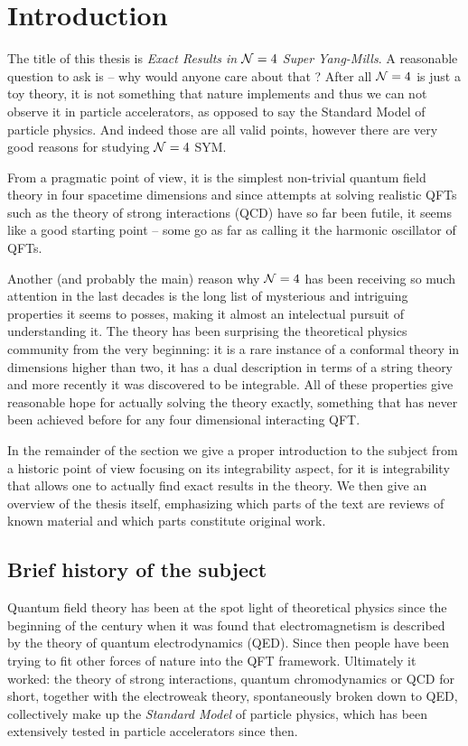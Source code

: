 
\section{Introduction}

The title of this thesis is \emph{Exact Results in $\mathcal{N}=4$ Super Yang-Mills}. A reasonable question to ask is -- why would anyone care about that ? 
After all $\mathcal{N}=4$ is just a toy theory, it is not something that nature implements and thus we can not observe it in particle accelerators, as opposed to say the Standard Model of particle physics. 
And indeed those are all valid points, however there are very good reasons for studying $\mathcal{N}=4$ SYM. 

From a pragmatic point of view, it is the simplest non-trivial quantum field theory in four spacetime dimensions and since attempts at solving realistic QFTs such as the theory of strong interactions (QCD) have so far been futile, it seems like a good starting point -- some go as far as calling it the harmonic oscillator of QFTs. 

Another (and probably the main) reason why $\mathcal{N}=4$ has been receiving so much attention in the last decades is the long list of mysterious and intriguing properties it seems to posses, making it almost an intelectual pursuit of understanding it. 
The theory has been surprising the theoretical physics community from the very beginning: it is a rare instance of a conformal theory in dimensions higher than two, it has a dual description in terms of a string theory and more recently it was discovered to be integrable. 
All of these properties give reasonable hope for actually solving the theory exactly, something that has never been achieved before for any four dimensional interacting QFT.

In the remainder of the section we give a proper introduction to the subject from a historic point of view focusing on its integrability aspect, for it is integrability that allows one to actually find exact results in the theory. We then give an overview of the thesis itself, emphasizing which parts of the text are reviews of known material and which parts constitute original work.

\subsection{Brief history of the subject}

Quantum field theory has been at the spot light of theoretical physics since the beginning of the century when it was found that electromagnetism is described by the theory of quantum electrodynamics (QED). Since then people have been trying to fit other forces of nature into the QFT framework. 
Ultimately it worked: the theory of strong interactions, quantum chromodynamics or QCD for short, together with the electroweak theory, spontaneously broken down to QED, collectively make up the \emph{Standard Model} of particle physics, which has been extensively tested in particle accelerators since then. 

